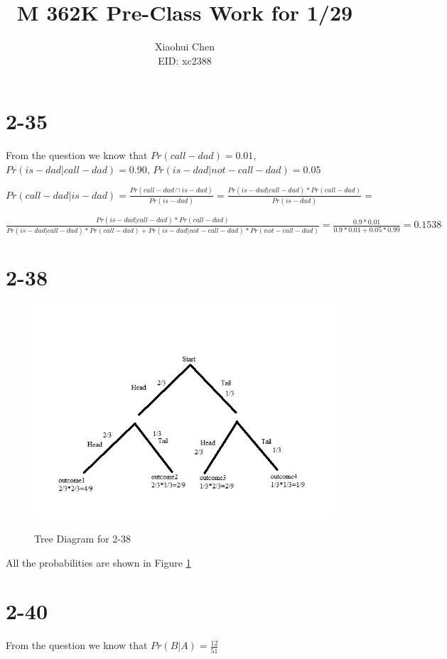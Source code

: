 \documentclass[12pt]{article}
\author{Xiaohui Chen \\EID: xc2388}
\title{M 362K Pre-Class Work for 1/29}
\begin{document}
\maketitle
\begin{spacing}{2.0}

\section*{2-35}
From the question we know that $Pr(call-dad)=0.01$, $Pr(is- dad|call-dad)=0.90$, $Pr(is-dad|not-call-dad)=0.05$

$Pr(call-dad|is-dad)=\frac{Pr(call-dad\cap is-dad)}{Pr(is-dad)}= \frac{Pr(is-dad|call-dad)*Pr(call-dad)}{Pr(is-dad)}=$

$\frac{Pr(is-dad|call-dad)*Pr(call-dad)}{Pr(is-dad|call-dad)* Pr(call-dad)+ Pr(is-dad|not-call-dad)*Pr(not-call-dad)} =\frac{0.9*0.01}{0.9*0.01+0.05*0.99}=0.1538$

\section*{2-38}
\begin{figure}
  \centering
  \includegraphics[width=5.5in]{tree}\\
  \caption{Tree Diagram for 2-38}\label{tree}
\end{figure}

All the probabilities are shown in Figure \ref{tree}

\section*{2-40}
From the question we know that $Pr(B|A)=\frac{12}{51}$


\end{spacing}
\end{document}
